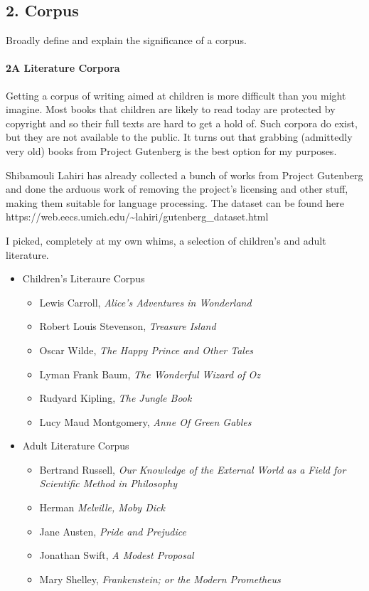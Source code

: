 \documentclass[11pt]{article}
\providecommand{\tightlist}{%
      \setlength{\itemsep}{0pt}\setlength{\parskip}{0pt}}
\begin{document}
    \subsection{2. Corpus}\label{corpus}

Broadly define and explain the significance of a corpus.

    \paragraph{2A Literature Corpora}\label{a-literature-corpora}

Getting a corpus of writing aimed at children is more difficult than you
might imagine. Most books that children are likely to read today are
protected by copyright and so their full texts are hard to get a hold
of. Such corpora do exist, but they are not available to the public. It
turns out that grabbing (admittedly very old) books from Project
Gutenberg is the best option for my purposes.

Shibamouli Lahiri has already collected a bunch of works from Project
Gutenberg and done the arduous work of removing the project's licensing
and other stuff, making them suitable for language processing. The
dataset can be found here
https://web.eecs.umich.edu/\textasciitilde{}lahiri/gutenberg\_dataset.html

I picked, completely at my own whims, a selection of children's and
adult literature.

\begin{itemize}
\tightlist
\item
  Children's Literaure Corpus

  \begin{itemize}
  \tightlist
  \item
    Lewis Carroll, \emph{Alice's Adventures in Wonderland}
  \item
    Robert Louis Stevenson, \emph{Treasure Island}
  \item
    Oscar Wilde, \emph{The Happy Prince and Other Tales}
  \item
    Lyman Frank Baum, \emph{The Wonderful Wizard of Oz}
  \item
    Rudyard Kipling, \emph{The Jungle Book}
  \item
    Lucy Maud Montgomery, \emph{Anne Of Green Gables}
  \end{itemize}
\item
  Adult Literature Corpus

  \begin{itemize}
  \tightlist
  \item
    Bertrand Russell, \emph{Our Knowledge of the External World as a
    Field for Scientific Method in Philosophy}
  \item
    Herman \emph{Melville, Moby Dick}
  \item
    Jane Austen, \emph{Pride and Prejudice}
  \item
    Jonathan Swift, \emph{A Modest Proposal}
  \item
    Mary Shelley, \emph{Frankenstein; or the Modern Prometheus}
  \end{itemize}
\end{itemize}
\end{document}
